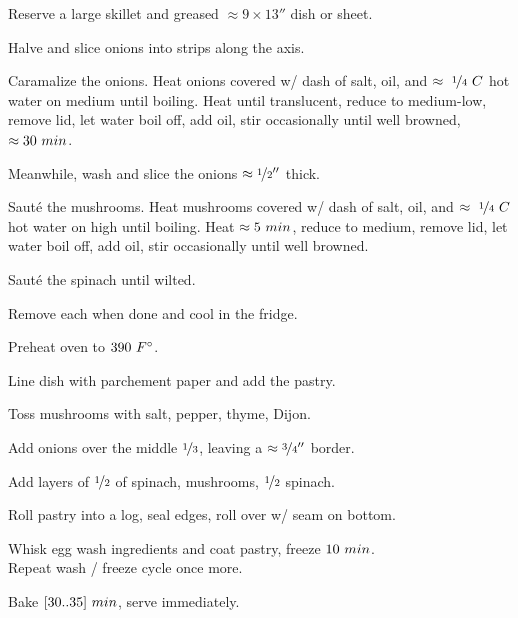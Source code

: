 \begin{preparation}
	\item Reserve a large skillet and greased $\approx9\times13''$ dish or sheet.
	\item Halve and slice onions into strips along the axis.
	\item Caramalize the onions.
		Heat onions covered w/ dash of salt, oil, and $\approx~\onefourth~C$ hot water on medium until boiling.
		Heat until translucent, reduce to medium-low, remove lid, let water boil off, add oil, stir occasionally until well browned, $\approx30~\minute$.
	\item Meanwhile, wash and slice the onions $\approx\onehalf''$ thick.
	\item Saut\'{e} the mushrooms.
		Heat mushrooms covered w/ dash of salt, oil, and $\approx~\onefourth~C$ hot water on high until boiling.
		Heat $\approx5~\minute$, reduce to medium, remove lid, let water boil off, add oil, stir occasionally until well browned.
	\item Saut\'{e} the spinach until wilted.
	\item Remove each when done and cool in the fridge.
	\item Preheat oven to $390~\Fahrenheit$.
	\item Line dish with parchement paper and add the pastry.
	\item Toss mushrooms with salt, pepper, thyme, Dijon.
	\item Add onions over the middle $\onethird$, leaving a $\approx\threefourth''$ border.
	\item Add layers of $\onehalf$ of spinach, mushrooms, $\onehalf$ spinach.
	\item Roll pastry into a log, seal edges, roll over w/ seam on bottom.
	\item Whisk egg wash ingredients and coat pastry, freeze $10~\minute$.\\
		Repeat wash / freeze cycle once more.
	\item Bake $[30..35]~\minute$, serve immediately.
\end{preparation}


\recipeend%
